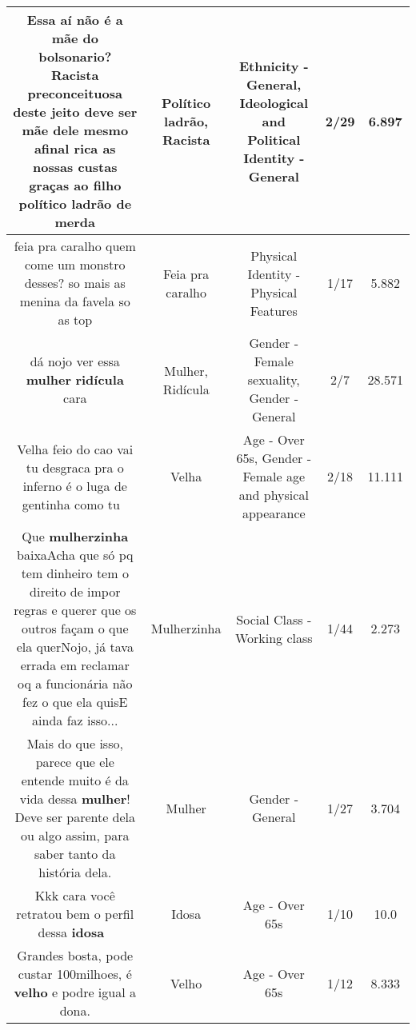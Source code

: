 \documentclass[11pt]{article}
\newlength\mylength
\begin{document}
\begin{center}
\begin{longtable}{|C{.65\mylength}|C{.30\mylength}|C{.12\mylength}|C{.12\mylength}|C{.12\mylength}|}
  \small Essa aí não é a mãe do bolsonario? \textbf{Racista} preconceituosa deste jeito deve ser mãe dele mesmo afinal rica as nossas custas graças ao filho \textbf{político ladrão} de merda\normalsize   & Político ladrão, Racista & Ethnicity - General, Ideological and Political Identity - General & 2/29 & 6.897 \\  \hline
  \small feia pra caralho quem come um monstro desses? so mais as menina da favela so as  top\normalsize   & Feia pra caralho & Physical Identity - Physical Features & 1/17 & 5.882 \\  \hline
  \small dá nojo ver essa \textbf{mulher} \textbf{ridícula} cara\normalsize   & Mulher, Ridícula & Gender - Female sexuality, Gender - General & 2/7 & 28.571 \\  \hline
  \small Velha feio do cao vai tu desgraca pra o inferno é o luga de gentinha como tu 👿\normalsize   & Velha & Age - Over 65s, Gender - Female age and physical appearance & 2/18 & 11.111 \\  \hline
  \small Que \textbf{mulherzinha} baixaAcha que só pq tem dinheiro tem o direito de impor regras e querer que os outros façam o que ela querNojo, já tava errada em reclamar oq a funcionária não fez o que ela quisE ainda faz isso...\normalsize   & Mulherzinha & Social Class - Working class & 1/44 & 2.273 \\  \hline
  \small Mais do que isso, parece que ele entende muito é da vida dessa \textbf{mulher}! Deve ser parente dela ou algo assim, para saber tanto da história dela.\normalsize   & Mulher & Gender - General & 1/27 & 3.704 \\  \hline
  \small Kkk cara você retratou bem o perfil dessa \textbf{idosa} 🤣\normalsize   & Idosa & Age - Over 65s & 1/10 & 10.0 \\  \hline
  \small Grandes bosta, pode custar 100milhoes, é \textbf{velho} e podre igual a dona.\normalsize   & Velho & Age - Over 65s & 1/12 & 8.333 \\  \hline

\end{longtable}
\end{center}
\end{document}

